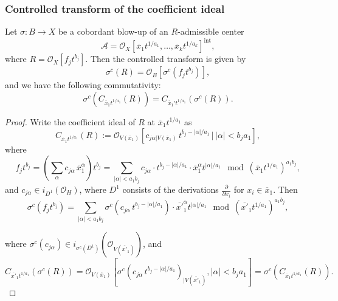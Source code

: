 \documentclass{amsart}
\newcommand{\cO}{{\mathcal O}}
\newcommand{\inte}{{\operatorname{int}}}
\begin{document}
\subsubsection{Controlled transform of the coefficient ideal}

\begin{lemma} \label{ccc}
Let $\sigma: B \to X$ be a cobordant blow-up of an $R$-admissible center 
\[
\mathcal{A} = \mathcal{O}_X[\overline{x}_1 t^{1/a_1}, \ldots, \overline{x}_k t^{1/a_k}]^{\inte},
\]
where $R = \mathcal{O}_X[f_j t^{b_j}]$. Then the controlled transform is given by
\[
\sigma^c(R) = \mathcal{O}_B[\sigma^c(f_j t^{b_j})],
\]
and we have the following commutativity:
\[
\sigma^c\left(C_{\overline{x}_1 t^{1/a_1}}(R)\right) = C_{\overline{x}_1' t^{1/a_1}}(\sigma^c(R)).
\]
\end{lemma}

\begin{proof} Write the coefficient ideal of \( R \) at \( \overline{x}_1 t^{1/a_1} \) as
\[
C_{\overline{x}_1 t^{1/a_1}}(R) := \mathcal{O}_{V(\overline{x}_1)}\left[ c_{j\alpha|V(\overline{x}_1)} \, t^{b_j - |\alpha|/a_1} \,\big|\, |\alpha| < b_j a_1 \right],
\]
where
\[
f_j t^{b_j} = \left( \sum_{\alpha} c_{j\alpha} \, \overline{x}_1^\alpha \right) t^{b_j} 
= \sum_{|\alpha| < a_1 b_j} c_{j\alpha} \cdot t^{b_j - |\alpha|/a_1} \cdot \overline{x}_1^\alpha t^{|\alpha|/a_1} 
\mod \left( \overline{x}_1 t^{1/a_1} \right)^{a_1 b_j},
\]
and \( c_{j\alpha} \in i_{D^1}(\mathcal{O}_H) \), where \( D^1 \) consists of the derivations \( \frac{\partial}{\partial x_i} \) for \( x_i \in \overline{x}_1 \). Then
\[
\sigma^c(f_j t^{b_j}) = 
 \sum_{|\alpha| < a_1 b_j} \sigma^c(c_{j\alpha} \, t^{b_j - |\alpha|/a_1}) \cdot \overline{x'}_1^\alpha t^{|\alpha|/a_1} \mod (\overline{x'}_1t^{1/a_1})^{a_1 b_j}
,\] 

where $\sigma^c(c_{j\alpha})\in  i_{\sigma^c(D^1)}(\mathcal{O}_{V(\overline{x'}_1)})$, and
 \[
C_{\overline{x'}_1 t^{1/a_1}}(\sigma^c(R)) = \mathcal{O}_{V(\overline{x}_1)}\left[ \sigma^c(c_{j\alpha} \, t^{b_j - |\alpha|/a_1})_{|V(\overline{x'}_1)}, |\alpha| < b_j a_1 \right]=
\sigma^c(C_{\overline{x}_1 t^{1/a_1}}(R)).\] 
\end{proof}%
 
\end{document}
